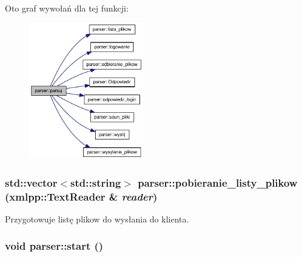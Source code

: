 Oto graf wywołań dla tej funkcji:\nopagebreak
\begin{figure}[H]
\begin{center}
\leavevmode
\includegraphics[width=141pt]{dd/dad/a00005_9ce7290217bd14e4efcbe2cad32ccf95_cgraph}
\end{center}
\end{figure}
\hypertarget{a00005_05500b74ebdcc1578ead4c31fca73a5b}{
\subsubsection[{pobieranie\_\-listy\_\-plikow}]{\setlength{\rightskip}{0pt plus 5cm}std::vector$<$std::string$>$ parser::pobieranie\_\-listy\_\-plikow (xmlpp::TextReader \& {\em reader})}}
\label{dd/dad/a00005_05500b74ebdcc1578ead4c31fca73a5b}


Przygotowuje listę plikow do wysłania do klienta. 

\hypertarget{a00005_7793913f528921aa22c4b6cc259a0a14}{
\subsubsection[{start}]{\setlength{\rightskip}{0pt plus 5cm}void parser::start ()}}
\label{dd/dad/a00005_7793913f528921aa22c4b6cc259a0a14}




